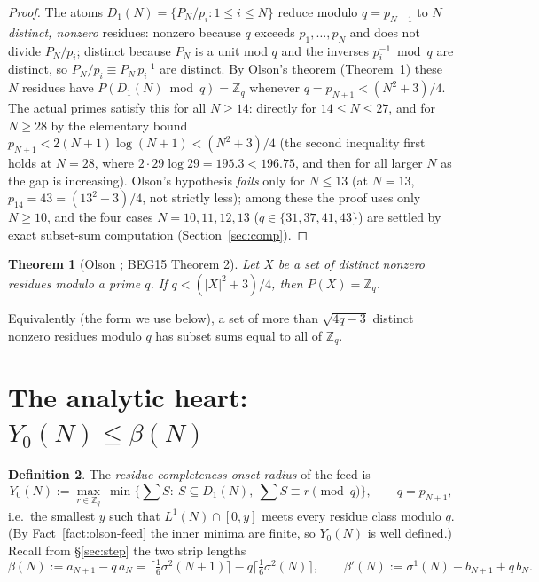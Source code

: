 \documentclass[11pt]{amsart}
\theoremstyle{plain}
\newtheorem{theorem}{Theorem}[section]
\theoremstyle{definition}
\newtheorem{definition}[theorem]{Definition}
\newcommand{\Z}{\mathbb{Z}}
\begin{document}
\begin{proof}
The atoms $D_1(N)=\{P_N/p_i:1\le i\le N\}$ reduce modulo $q=p_{N+1}$ to
$N$ \emph{distinct, nonzero} residues: nonzero because $q$ exceeds
$p_1,\dots,p_N$ and does not divide $P_N/p_i$; distinct because $P_N$ is a unit
mod $q$ and the inverses $p_i^{-1}\bmod q$ are distinct, so
$P_N/p_i\equiv P_N\,p_i^{-1}$ are distinct.  By Olson's theorem
(Theorem~\ref{thm:olson}) these $N$ residues have $P(D_1(N)\bmod q)=\Z_q$ whenever
$q=p_{N+1}<(N^2+3)/4$.  The actual primes satisfy this for all $N\ge 14$: directly
for $14\le N\le 27$, and for $N\ge 28$ by the elementary bound
$p_{N+1}<2(N+1)\log(N+1)<(N^2+3)/4$ (the second inequality first holds at $N=28$,
where $2\cdot 29\log 29=195.3<196.75$, and then for all larger $N$ as the gap is
increasing).  Olson's hypothesis \emph{fails} only for $N\le 13$ (at $N=13$,
$p_{14}=43=(13^2+3)/4$, not strictly less); among these the proof uses only
$N\ge 10$, and the four cases $N=10,11,12,13$ ($q\in\{31,37,41,43\}$) are settled
by exact subset-sum computation (Section~\ref{sec:comp}).
\end{proof}

\begin{theorem}[Olson \cite{Olson1968}; BEG15 Theorem 2]\label{thm:olson}
Let $X$ be a set of distinct nonzero residues modulo a prime $q$.  If
$q<(|X|^2+3)/4$, then $P(X)=\Z_q$.
\end{theorem}

Equivalently (the form we use below), a set of more than $\sqrt{4q-3}$ distinct
nonzero residues modulo $q$ has subset sums equal to all of $\Z_q$.

\section{The analytic heart: \texorpdfstring{$Y_0(N)\le\beta(N)$}{Y0(N) <= beta(N)}}
\label{sec:analytic}

\begin{definition}\label{def:Y0}
The \emph{residue-completeness onset radius} of the feed is
\[
Y_0(N):=\max_{r\in\Z_q}\ \min\bigl\{\textstyle\sum S:\ S\subseteq D_1(N),\
\textstyle\sum S\equiv r\!\!\pmod q\bigr\},\qquad q=p_{N+1},
\]
i.e.\ the smallest $y$ such that $L^1(N)\cap[0,y]$ meets every residue class
modulo $q$.  (By Fact~\ref{fact:olson-feed} the inner minima are finite, so
$Y_0(N)$ is well defined.)  Recall from \S\ref{sec:step} the two strip lengths
\[
\beta(N):=a_{N+1}-q\,a_N
=\bigl\lceil\tfrac16\sigma^2(N+1)\bigr\rceil
-q\bigl\lceil\tfrac16\sigma^2(N)\bigr\rceil ,
\qquad
\beta'(N):=\sigma^1(N)-b_{N+1}+q\,b_N .
\]
\end{definition}
\end{document}
